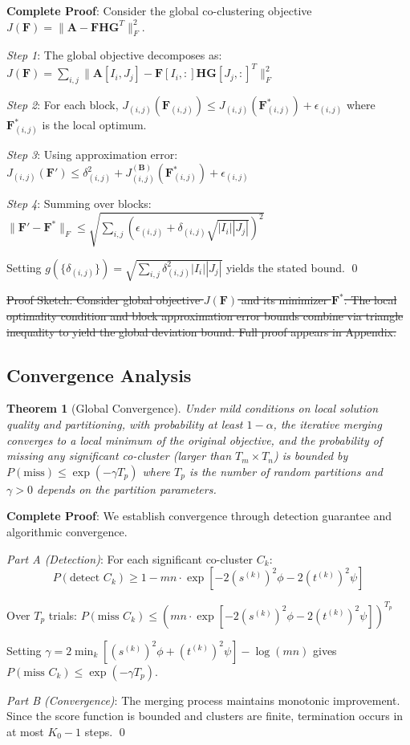 \documentclass[journal]{IEEEtran}
\newtheorem{theorem}{Theorem}
\begin{document}
{\color{blue}\textbf{Complete Proof}: Consider the global co-clustering objective $J(\mathbf{F}) = \|\mathbf{A} - \mathbf{F}\mathbf{H}\mathbf{G}^T\|_F^2$.

\textit{Step 1}: The global objective decomposes as: $J(\mathbf{F}) = \sum_{i,j} \|\mathbf{A}[I_i, J_j] - \mathbf{F}[I_i, :]\mathbf{H}\mathbf{G}[J_j, :]^T\|_F^2$

\textit{Step 2}: For each block, $J_{(i,j)}(\mathbf{F}_{(i,j)}) \leq J_{(i,j)}(\mathbf{F}_{(i,j)}^*) + \epsilon_{(i,j)}$ where $\mathbf{F}_{(i,j)}^*$ is the local optimum.

\textit{Step 3}: Using approximation error: $J_{(i,j)}(\mathbf{F}') \leq \delta_{(i,j)}^2 + J_{(i,j)}^{(\mathbf{B})}(\mathbf{F}_{(i,j)}^*) + \epsilon_{(i,j)}$

\textit{Step 4}: Summing over blocks: $\|\mathbf{F}' - \mathbf{F}^*\|_F \leq \sqrt{\sum_{i,j} (\epsilon_{(i,j)} + \delta_{(i,j)}\sqrt{|I_i||J_j|})^2}$

Setting $g(\{\delta_{(i,j)}\}) = \sqrt{\sum_{i,j} \delta_{(i,j)}^2|I_i||J_j|}$ yields the stated bound. \qed}

\sout{Proof Sketch: Consider global objective $J(\mathbf{F})$ and its minimizer $\mathbf{F}^*$. The local optimality condition and block approximation error bounds combine via triangle inequality to yield the global deviation bound. Full proof appears in Appendix.}

\subsection{Convergence Analysis}
\begin{theorem}[Global Convergence]
    \label{thm:global-convergence}
    Under mild conditions on local solution quality and partitioning, with probability at least $1-\alpha$, the iterative merging converges to a local minimum of the original objective, and the probability of missing any significant co-cluster (larger than $T_m \times T_n$) is bounded by $P(\text{miss}) \le \exp(-\gamma T_p)$ where $T_p$ is the number of random partitions and $\gamma > 0$ depends on the partition parameters.
\end{theorem}

{\color{blue}\textbf{Complete Proof}: We establish convergence through detection guarantee and algorithmic convergence.

\textit{Part A (Detection)}: For each significant co-cluster $C_k$:
$$P(\text{detect } C_k) \geq 1 - mn \cdot \exp\left[-2(s^{(k)})^2\phi - 2(t^{(k)})^2\psi\right]$$

Over $T_p$ trials: $P(\text{miss } C_k) \leq \left(mn \cdot \exp\left[-2(s^{(k)})^2\phi - 2(t^{(k)})^2\psi\right]\right)^{T_p}$

Setting $\gamma = 2\min_k[(s^{(k)})^2\phi + (t^{(k)})^2\psi] - \log(mn)$ gives $P(\text{miss } C_k) \leq \exp(-\gamma T_p)$.

\textit{Part B (Convergence)}: The merging process maintains monotonic improvement. Since the score function is bounded and clusters are finite, termination occurs in at most $K_0 - 1$ steps. \qed}
\end{document}
